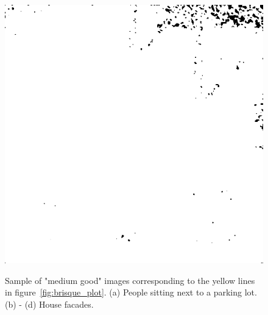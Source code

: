 \begin{figure}[H]
\begin{minipage}[t]{0.245\textwidth}
    \subcaption{}
    \label{fig:half3}
\end{minipage}
\begin{minipage}[t]{0.245\textwidth}
    \includegraphics[width = \textwidth]{result/SPC_NRQA/h62_512_m30.PNG}
    \subcaption{}
    \label{fig:half4}
\end{minipage}
    \caption{Sample of "medium good" images corresponding to the yellow lines in figure~\ref{fig:brisque_plot}.
    (a)  People sitting next to a parking lot. (b) - (d) House facades.}
    \label{fig:half}
\end{figure}

